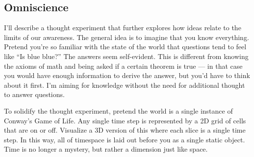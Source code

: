 \documentclass[11pt, oneside]{article}
\begin{document}
%

\subsection{Omniscience}


I'll describe a thought experiment that further explores
how ideas relate to the limits of our awareness.
The general idea is to imagine that you know everything.
Pretend
you're so familiar with the state of the world that questions tend to
feel like ``Is blue blue?'' The answers seem self-evident.
This is
different from knowing the axioms of math and being asked if a certain theorem
is true --- in that case you would have enough information to derive the answer,
but you'd have to think about it first.
I'm aiming for knowledge without the need for additional thought to answer
questions.

To solidify the thought experiment, pretend the world is a single instance of
Conway's Game of Life. Any single time step is represented by a 2D grid of cells
that are on or off.
Visualize a 3D version of this where each slice is a single time step. In this
way, all of timespace is laid out before you as a single static object. Time is
no longer a mystery, but rather a dimension just like space.
\end{document}
